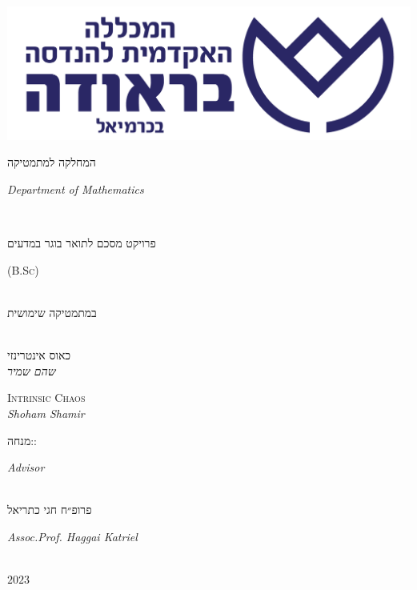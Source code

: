 \documentclass{article}
\begin{document}
\begin{center}
    \includegraphics[scale=0.15]{figs/braude.png}\\\smallskip
    \textcolor{braude}{המחלקה למתמטיקה\\\begin{otherlanguage}{English}\textit{Department of Mathematics}\end{otherlanguage}}\\\vspace{20mm}
    {\LARGE פרויקט מסכם לתואר בוגר במדעים \begin{otherlanguage}{English}(\textsc{B.Sc})\end{otherlanguage}\\במתמטיקה שימושית}\\\vspace{20mm}
    {\fontsize{30}{36}\selectfont כאוס אינטרינזי}\\\medskip
    {\Large \textit{שהם שמיר}}\\\vspace{10mm}
    \begin{otherlanguage}{English}
        {\fontsize{30}{36}\selectfont\textsc{Intrinsic Chaos}}\\\medskip
        {\Large \textit{Shoham Shamir}}\\\vspace{35mm}
    \end{otherlanguage}
    מנחה:\hfill :\begin{otherlanguage}{English}\textit{Advisor}\end{otherlanguage}\\
    פרופ״ח חגי כתריאל\hfill\begin{otherlanguage}{English}\textit{Assoc.\hspace{0.5mm}Prof. Haggai Katriel}\end{otherlanguage}\\\vfill
    \(2023\)
\end{center}
\thispagestyle{empty}
\newpage
\end{document}
